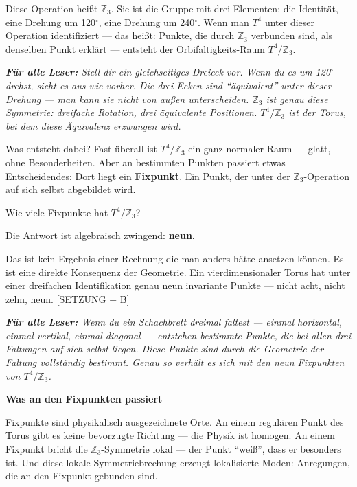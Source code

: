 \documentclass[11pt,oneside]{book}
\newenvironment{laierspur}{%
  \par\vspace{4pt}%
  \noindent\small\itshape\color{blue!60!black}%
  \textbf{Für alle Leser:}\enspace\ignorespaces}{%
  \par\vspace{4pt}\normalsize\normalfont\normalcolor}
\begin{document}
Diese Operation heißt $\mathbb{Z}_3$. Sie ist die Gruppe mit drei Elementen: die
Identität, eine Drehung um 120$^\circ$, eine Drehung um 240$^\circ$. Wenn man $T^4$ unter
dieser Operation identifiziert — das heißt: Punkte, die durch $\mathbb{Z}_3$ verbunden
sind, als denselben Punkt erklärt — entsteht der Orbifaltigkeits-Raum $T^4/\mathbb{Z}_3$.


\begin{laierspur}
Stell dir ein gleichseitiges Dreieck vor. Wenn du es um 120$^\circ$
drehst, sieht es aus wie vorher. Die drei Ecken sind \enquote{äquivalent} unter
dieser Drehung — man kann sie nicht von außen unterscheiden. $\mathbb{Z}_3$ ist
genau diese Symmetrie: dreifache Rotation, drei äquivalente Positionen.
$T^4/\mathbb{Z}_3$ ist der Torus, bei dem diese Äquivalenz erzwungen wird.
\end{laierspur}

Was entsteht dabei? Fast überall ist $T^4/\mathbb{Z}_3$ ein ganz normaler Raum —
glatt, ohne Besonderheiten. Aber an bestimmten Punkten passiert etwas
Entscheidendes: Dort liegt ein \textbf{Fixpunkt}. Ein Punkt, der unter der
$\mathbb{Z}_3$-Operation auf sich selbst abgebildet wird.


Wie viele Fixpunkte hat $T^4/\mathbb{Z}_3$?


Die Antwort ist algebraisch zwingend: \textbf{neun}.


Das ist kein Ergebnis einer Rechnung die man anders hätte ansetzen können.
Es ist eine direkte Konsequenz der Geometrie. Ein vierdimensionaler Torus
hat unter einer dreifachen Identifikation genau neun invariante Punkte —
nicht acht, nicht zehn, neun. [SETZUNG + B]


\begin{laierspur}
Wenn du ein Schachbrett dreimal faltest — einmal horizontal,
einmal vertikal, einmal diagonal — entstehen bestimmte Punkte, die bei
allen drei Faltungen auf sich selbst liegen. Diese Punkte sind durch die
Geometrie der Faltung vollständig bestimmt. Genau so verhält es sich
mit den neun Fixpunkten von $T^4/\mathbb{Z}_3$.
\end{laierspur}

\textbf{Was an den Fixpunkten passiert}


Fixpunkte sind physikalisch ausgezeichnete Orte. An einem regulären Punkt
des Torus gibt es keine bevorzugte Richtung — die Physik ist homogen. An
einem Fixpunkt bricht die $\mathbb{Z}_3$-Symmetrie lokal — der Punkt \enquote{weiß}, dass er
besonders ist. Und diese lokale Symmetriebrechung erzeugt lokalisierte
Moden: Anregungen, die an den Fixpunkt gebunden sind.
\end{document}
